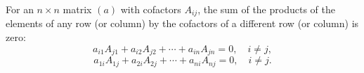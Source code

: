 For an $n \times n$ matrix $(a)$ with cofactors $A_{ij}$, the sum of the products of the elements of any row (or column) by the cofactors of a different row (or column) is zero:
$$a_{i1}A_{j1} + a_{i2}A_{j2} + \cdots + a_{in}A_{jn} = 0, \quad i \neq j,$$
$$a_{1i}A_{1j} + a_{2i}A_{2j} + \cdots + a_{ni}A_{nj} = 0, \quad i \neq j.$$
